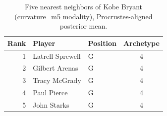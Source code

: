 \begin{table}[htbp]
  \centering\small
  \begin{tabular}{rllc}
    \toprule
    Rank & Player & Position & Archetype \\
    \midrule
    1 & Latrell Sprewell & G & 4 \\
    2 & Gilbert Arenas & G & 4 \\
    3 & Tracy McGrady & G & 4 \\
    4 & Paul Pierce & G & 4 \\
    5 & John Starks & G & 4 \\
    \bottomrule
  \end{tabular}
  \caption{Five nearest neighbors of Kobe Bryant (curvature_m5 modality), Procrustes-aligned posterior mean.}
  \label{tab:Kobe_Bryant_neighbors_curvature_m5}
\end{table}

